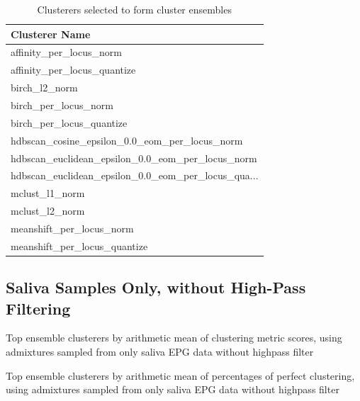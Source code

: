 \begin{table}[htbp]
\centering
\begin{tabular}{l}
\toprule
                                    Clusterer Name \\
\midrule
                           affinity\_per\_locus\_norm \\
                       affinity\_per\_locus\_quantize \\
                                     birch\_l2\_norm \\
                              birch\_per\_locus\_norm \\
                          birch\_per\_locus\_quantize \\
     hdbscan\_cosine\_epsilon\_0.0\_eom\_per\_locus\_norm \\
  hdbscan\_euclidean\_epsilon\_0.0\_eom\_per\_locus\_norm \\
hdbscan\_euclidean\_epsilon\_0.0\_eom\_per\_locus\_qua... \\
                                    mclust\_l1\_norm \\
                                    mclust\_l2\_norm \\
                          meanshift\_per\_locus\_norm \\
                      meanshift\_per\_locus\_quantize \\
\bottomrule
\end{tabular}
\caption{Clusterers selected to form cluster ensembles}
\label{table:Clusterers selected to form cluster ensembles}
\end{table}

\FloatBarrier
\subsection{Saliva Samples Only, without High-Pass Filtering}

\begin{table}[htbp]
\centering
{}
\caption{Top ensemble clusterers by arithmetic mean of clustering metric scores, using admixtures sampled from only saliva EPG data without highpass filter}
\label{table:top_ensemble_clusterers_by_metrics_highpass_0-sampleids_saliva-nruns_1000}
\end{table}

\begin{table}[htbp]
\centering
{}
\caption{Top ensemble clusterers by arithmetic mean of percentages of perfect clustering, using admixtures sampled from only saliva EPG data without highpass filter}
\label{table:top_ensemble_clusterers_by_binomial_confidence_highpass_0-sampleids_saliva-nruns_1000}
\end{table}

